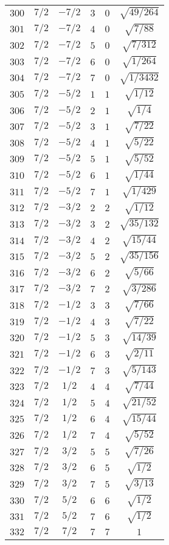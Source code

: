 \begin{table}
\begin{center}
\begin{tabular}{|c|c|c|c|c|c|}
$300$ & $7/2$ & $-7/2$ & $3$ & $0$ & $\sqrt{49/264}$ \\ 
$301$ & $7/2$ & $-7/2$ & $4$ & $0$ & $\sqrt{7/88}$ \\ 
$302$ & $7/2$ & $-7/2$ & $5$ & $0$ & $\sqrt{7/312}$ \\ 
$303$ & $7/2$ & $-7/2$ & $6$ & $0$ & $\sqrt{1/264}$ \\ 
$304$ & $7/2$ & $-7/2$ & $7$ & $0$ & $\sqrt{1/3432}$ \\ 
$305$ & $7/2$ & $-5/2$ & $1$ & $1$ & $\sqrt{1/12}$ \\ 
$306$ & $7/2$ & $-5/2$ & $2$ & $1$ & $\sqrt{1/4}$ \\ 
$307$ & $7/2$ & $-5/2$ & $3$ & $1$ & $\sqrt{7/22}$ \\ 
$308$ & $7/2$ & $-5/2$ & $4$ & $1$ & $\sqrt{5/22}$ \\ 
$309$ & $7/2$ & $-5/2$ & $5$ & $1$ & $\sqrt{5/52}$ \\ 
$310$ & $7/2$ & $-5/2$ & $6$ & $1$ & $\sqrt{1/44}$ \\ 
$311$ & $7/2$ & $-5/2$ & $7$ & $1$ & $\sqrt{1/429}$ \\ 
$312$ & $7/2$ & $-3/2$ & $2$ & $2$ & $\sqrt{1/12}$ \\ 
$313$ & $7/2$ & $-3/2$ & $3$ & $2$ & $\sqrt{35/132}$ \\ 
$314$ & $7/2$ & $-3/2$ & $4$ & $2$ & $\sqrt{15/44}$ \\ 
$315$ & $7/2$ & $-3/2$ & $5$ & $2$ & $\sqrt{35/156}$ \\ 
$316$ & $7/2$ & $-3/2$ & $6$ & $2$ & $\sqrt{5/66}$ \\ 
$317$ & $7/2$ & $-3/2$ & $7$ & $2$ & $\sqrt{3/286}$ \\ 
$318$ & $7/2$ & $-1/2$ & $3$ & $3$ & $\sqrt{7/66}$ \\ 
$319$ & $7/2$ & $-1/2$ & $4$ & $3$ & $\sqrt{7/22}$ \\ 
$320$ & $7/2$ & $-1/2$ & $5$ & $3$ & $\sqrt{14/39}$ \\ 
$321$ & $7/2$ & $-1/2$ & $6$ & $3$ & $\sqrt{2/11}$ \\ 
$322$ & $7/2$ & $-1/2$ & $7$ & $3$ & $\sqrt{5/143}$ \\ 
$323$ & $7/2$ & $1/2$ & $4$ & $4$ & $\sqrt{7/44}$ \\ 
$324$ & $7/2$ & $1/2$ & $5$ & $4$ & $\sqrt{21/52}$ \\ 
$325$ & $7/2$ & $1/2$ & $6$ & $4$ & $\sqrt{15/44}$ \\ 
$326$ & $7/2$ & $1/2$ & $7$ & $4$ & $\sqrt{5/52}$ \\ 
$327$ & $7/2$ & $3/2$ & $5$ & $5$ & $\sqrt{7/26}$ \\ 
$328$ & $7/2$ & $3/2$ & $6$ & $5$ & $\sqrt{1/2}$ \\ 
$329$ & $7/2$ & $3/2$ & $7$ & $5$ & $\sqrt{3/13}$ \\ 
$330$ & $7/2$ & $5/2$ & $6$ & $6$ & $\sqrt{1/2}$ \\ 
$331$ & $7/2$ & $5/2$ & $7$ & $6$ & $\sqrt{1/2}$ \\ 
$332$ & $7/2$ & $7/2$ & $7$ & $7$ & $1$ \\ 
\hline 
\end{tabular}
\end{center}
\end{table}

